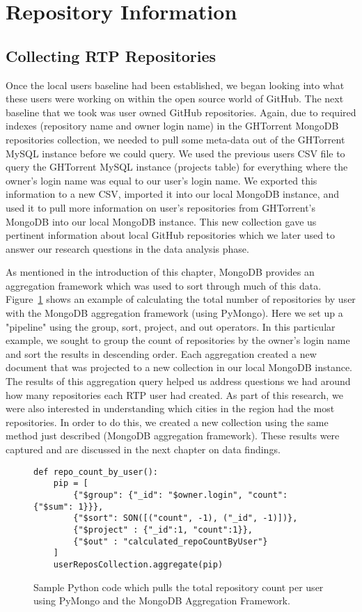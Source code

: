 \section{Repository Information}
\subsection{Collecting RTP Repositories}
Once the local users baseline had been established, we began looking into what these users were working on within the open source world of GitHub. The next baseline that we took was user owned GitHub repositories. Again, due to required indexes (repository name and owner login name) in the GHTorrent MongoDB repositories collection, we needed to pull some meta-data out of the GHTorrent MySQL instance before we could query. We used the previous users CSV file to query the GHTorrent MySQL instance (projects table) for everything where the owner's login name was equal to our user's login name. We exported this information to a new CSV, imported it into our local MongoDB instance, and used it to pull more information on user's repositories from GHTorrent's MongoDB into our local MongoDB instance. This new collection gave us pertinent information about local GitHub repositories which we later used to answer our research questions in the data analysis phase. 

As mentioned in the introduction of this chapter, MongoDB provides an aggregation framework which was used to sort through much of this data. Figure~\ref{fig:repo-count-code} shows an example of calculating the total number of repositories by user with the MongoDB aggregation framework (using PyMongo). Here we set up a "pipeline" using the group, sort, project, and out operators. In this particular example, we sought to group the count of repositories by the owner's login name and sort the results in descending order. Each aggregation created a new document that was projected to a new collection in our local MongoDB instance. The results of this aggregation query helped us address questions we had around how many repositories each RTP user had created. As part of this research, we were also interested in understanding which cities in the region had the most repositories. In order to do this, we created a new collection using the same method just described (MongoDB aggregation framework). These results were captured and are discussed in the next chapter on data findings.

\begin{figure}
\begin{lstlisting}
def repo_count_by_user():
    pip = [
        {"$group": {"_id": "$owner.login", "count": {"$sum": 1}}},
        {"$sort": SON([("count", -1), ("_id", -1)])},
        {"$project" : {"_id":1, "count":1}},
        {"$out" : "calculated_repoCountByUser"}
    ]
    userReposCollection.aggregate(pip)
\end{lstlisting}
\caption{Sample Python code which pulls the total repository count per user using PyMongo and the MongoDB Aggregation Framework.}
\label{fig:repo-count-code}
\end{figure}

